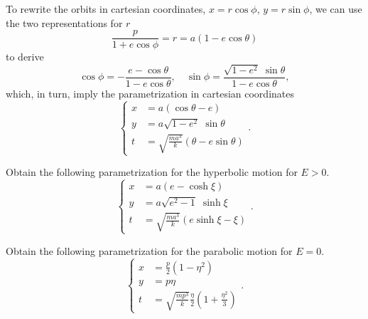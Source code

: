 \documentclass[english,fontsize=11pt,paper=a5,oneside]{scrbook}
\theoremstyle{definition}
\newenvironment{exercise}
  {\pushQED{\qed}\renewcommand{\qedsymbol}{$\maltese$}\exercisex}
  {\popQED\endexercisex}
\begin{document}
To rewrite the orbits in cartesian coordinates, $x = r \cos\phi$, $y=r \sin\phi$, we can use the two representations for $r$
\begin{equation}
  \frac{p}{1+e\cos\phi} = r = a(1-e\cos\theta)
\end{equation}
to derive
\begin{equation}
  \cos\phi = -\frac{e - \cos\theta}{1-e \cos\theta},\quad
  \sin\phi = \frac{\sqrt{1-e^2}\;\sin\theta}{1-e\cos\theta},
\end{equation}
which, in turn, imply the parametrization in cartesian coordinates
\begin{equation}
  \left\lbrace
  \begin{aligned}
    x & = a(\cos\theta - e)                         \\
    y & = a\sqrt{1-e^2}\;\sin\theta                 \\
    t & = \sqrt{\frac{ma^3}k}(\theta - e\sin\theta)
  \end{aligned}
  \right..
\end{equation}

\begin{exercise}
  Obtain the following parametrization for the hyperbolic motion for $E>0$.
  \begin{equation}
    \left\lbrace
    \begin{aligned}
      x & = a(e- \cosh\xi)                     \\
      y & = a\sqrt{e^2-1}\;\sinh\xi            \\
      t & = \sqrt{\frac{ma^3}k}(e\sinh\xi-\xi)
    \end{aligned}
    \right..
  \end{equation}
\end{exercise}

\begin{exercise}
  Obtain the following parametrization for the parabolic motion for $E=0$.
  \begin{equation}
    \left\lbrace
    \begin{aligned}
      x & = \frac p2 \left(1- \eta^2\right)                            \\
      y & = p\eta                                                      \\
      t & = \sqrt{\frac{mp^3}k}\frac\eta2\left(1+\frac{\eta^2}3\right)
    \end{aligned}
    \right..
  \end{equation}
\end{exercise}
\end{document}
